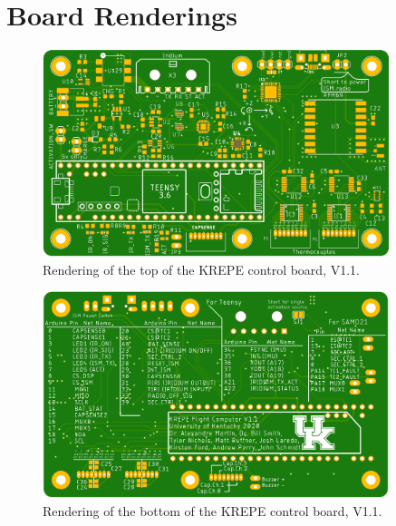 \documentclass{article}
\begin{document}
\section{Board Renderings}
\begin{figure}[H]
	\centering
	\includegraphics[width=0.9\textwidth]{images/krepe-top.png}
	\caption{Rendering of the top of the KREPE control board, V1.1.}
	\label{fig:board-top}
\end{figure}
\begin{figure}[H]
	\centering
	\includegraphics[width=0.9\textwidth]{images/krepe-bottom.png}
	\caption{Rendering of the bottom of the KREPE control board, V1.1.}
	\label{fig:board-bottom}
\end{figure}
%
\end{document}
